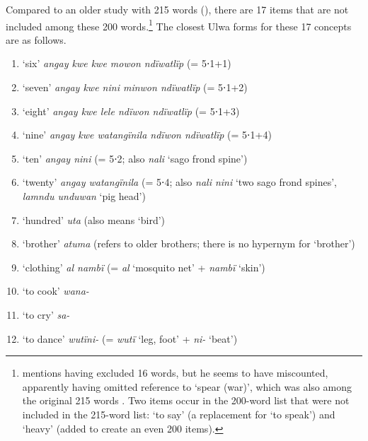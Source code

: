 Compared to an older study with 215 words (\citealt{Swadesh1950}), there are 17 items that are not included among these 200 words.\footnote{\citet[457]{Swadesh1952} mentions having excluded 16 words, but he seems to have miscounted, apparently having omitted reference to ‘spear (war)’, which was also among the original 215 words \citep[161]{Swadesh1950}. Two items occur in the 200-word list that were not included in the 215-word list: ‘to say’ (a replacement for ‘to speak’) and ‘heavy’ (added to create an even 200 items).} The closest Ulwa forms for these 17  concepts are as follows.

\begin{enumerate}[noitemsep, label={\arabic*}, align=left, widest=190, labelsep=1ex,leftmargin=*]
\item ‘six’ \textit{angay kwe kwe mowon ndïwatlïp} (= 5⋅1+1)

\item ‘seven’ \textit{angay kwe nini minwon ndïwatlïp} (= 5⋅1+2)

\item ‘eight’ \textit{angay kwe lele ndïwon ndïwatlïp} (= 5⋅1+3)

\item ‘nine’ \textit{angay kwe watangïnila ndïwon ndïwatlïp} (= 5⋅1+4)

\item ‘ten’ \textit{angay nini} (= 5⋅2; also \textit{nali} ‘sago frond spine’)

\item ‘twenty’ \textit{angay watangïnila} (= 5⋅4; also \textit{nali nini} ‘two sago frond spines’, \linebreak \textit{lamndu unduwan} ‘pig head’)

\item ‘hundred’ \textit{uta} (also means ‘bird’)

\item ‘brother’ \textit{atuma} (refers to older brothers; there is no hypernym for ‘brother’)

\item ‘clothing’ \textit{al nambï} (= \textit{al} ‘mosquito net’ + \textit{nambï} ‘skin’)

\item ‘to cook’ \textit{wana-}

\item ‘to cry’ \textit{sa-}

\item ‘to dance’ \textit{wutïni-} (= \textit{wutï} ‘leg, foot’ + \textit{ni-} ‘beat’)


\end{enumerate}
